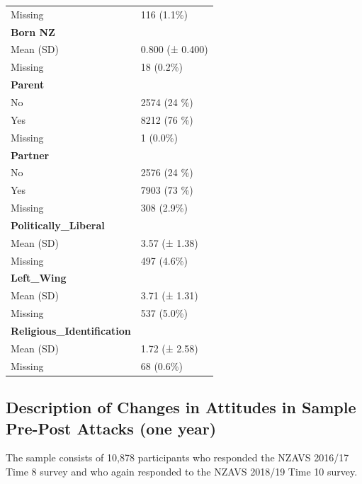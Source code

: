 \documentclass[
  singlecolumn]{report}
\begin{document}
\begin{longtable}[]{@{}ll@{}}
Missing & 116 (1.1\%) \\
\textbf{Born NZ} & \\
Mean (SD) & 0.800 (± 0.400) \\
Missing & 18 (0.2\%) \\
\textbf{Parent} & \\
No & 2574 (24 \%) \\
Yes & 8212 (76 \%) \\
Missing & 1 (0.0\%) \\
\textbf{Partner} & \\
No & 2576 (24 \%) \\
Yes & 7903 (73 \%) \\
Missing & 308 (2.9\%) \\
\textbf{Politically\_Liberal} & \\
Mean (SD) & 3.57 (± 1.38) \\
Missing & 497 (4.6\%) \\
\textbf{Left\_Wing} & \\
Mean (SD) & 3.71 (± 1.31) \\
Missing & 537 (5.0\%) \\
\textbf{Religious\_Identification} & \\
Mean (SD) & 1.72 (± 2.58) \\
Missing & 68 (0.6\%) \\
\bottomrule()
\end{longtable}

\hypertarget{description-of-changes-in-attitudes-in-sample-pre-post-attacks-one-year}{%
\subsection{Description of Changes in Attitudes in Sample Pre-Post
Attacks (one
year)}\label{description-of-changes-in-attitudes-in-sample-pre-post-attacks-one-year}}

The sample consists of 10,878 participants who responded the NZAVS
2016/17 Time 8 survey and who again responded to the NZAVS 2018/19 Time
10 survey.
\end{document}
